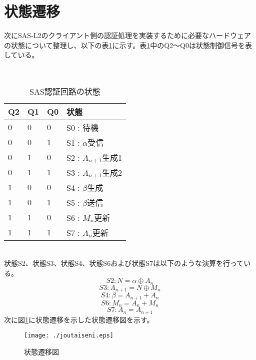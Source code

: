\documentclass{thesis}
\begin{document}
\section{状態遷移}
次にSAS-L2のクライアント側の認証処理を実装するために必要なハードウェアの状態について整理し、以下の表\ref{ハードウェアの状態}に示す。表\ref{ハードウェアの状態}中のQ2～Q0は状態制御信号を表している。
\begin{table}[htb]
　\begin{center}
\caption{SAS認証回路の状態}
\label{ハードウェアの状態}
  \begin{tabular}{|p{1cm}|p{1cm}|p{1cm}|p{3cm}|} \hline
  Q2 & Q1 & Q0 & 状態 \\ \hline \hline
   0  &  0  &  0  & S0 : 待機 \\ \hline
   0  &  0  &  1  & S1 : $\alpha$受信 \\ \hline
   0  &  1  &  0  & S2 : $A_{n+1}$生成1 \\ \hline
   0  &  1  &  1  & S3 : $A_{n+1}$生成2 \\ \hline
   1  &  0  &  0  & S4 : $\beta$生成 \\ \hline
   1  &  0  &  1  & S5 : $\beta$送信 \\ \hline
   1  &  1  &  0  & S6 : $M_n$更新 \\ \hline
   1  &  1  &  1  & S7 : $A_n$更新 \\ \hline
  \end{tabular}
  \end{center}
\end{table}　\\
状態S2、状態S3、状態S4、状態S6および状態S7は以下のような演算を行っている。
\begin{equation}\label{eqn:S2}
	S2 : N = \alpha \oplus A_n
\end{equation}
\begin{equation}\label{eqn:S3}
	S3 : A_{n+1} = N \oplus M_n
\end{equation}
\begin{equation}\label{eqn:S4}
	S4 : \beta = A_{n+1} + A_n
\end{equation}
\begin{equation}\label{eqn:S6}
	S6 : M_n = A_n + M_n
\end{equation}
\begin{equation}\label{eqn:S7}
	S7 : A_n = A_{n+1}
\end{equation}
次に図\ref{状態遷移図}に状態遷移を示した状態遷移図を示す。
\begin{figure}[H]
 \center
 \texttt{[image: ./joutaiseni.eps]}
 \caption{状態遷移図}
 \label{状態遷移図}
\end{figure}
\end{document}
